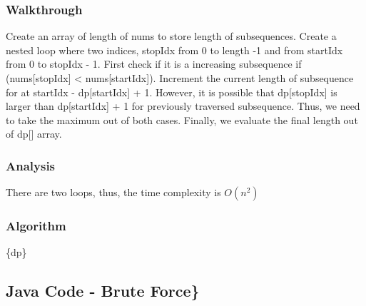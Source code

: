 \documentclass[]{book}
\begin{document}
\hypertarget{walkthrough-26}{%
\subsubsection{Walkthrough}\label{walkthrough-26}}

Create an array of length of nums to store length of subsequences. Create a nested loop where two indices, stopIdx
from 0 to length -1 and from startIdx from 0 to stopIdx - 1. First check if it is a increasing subsequence if
(nums{[}stopIdx{]} \textless{} nums{[}startIdx{]}). Increment the current length of subsequence for at startIdx - dp{[}startIdx{]} + 1.
However, it is possible that dp{[}stopIdx{]} is larger than dp{[}startIdx{]} + 1 for previously traversed subsequence. Thus,
we need to take the maximum out of both cases. Finally, we evaluate the final length out of dp{[}{]} array.

\hypertarget{analysis-29}{%
\subsubsection{Analysis}\label{analysis-29}}

There are two loops, thus, the time complexity is \(O(n^2)\)

\hypertarget{algorithm-29}{%
\subsubsection{Algorithm}\label{algorithm-29}}

\{dp\}

\hypertarget{java-code---brute-force}{%
\subsection{Java Code - Brute Force\}}\label{java-code---brute-force}}
\end{document}
